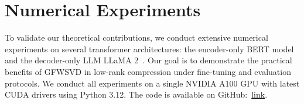 \documentclass{article}
\begin{document}





\section{Numerical Experiments}
\label{sec:experiments}

To validate our theoretical contributions, we conduct extensive numerical experiments on several transformer architectures: the encoder-only BERT model~\cite{bert} and the decoder-only LLM LLaMA 2~\cite{llama2}. Our goal is to demonstrate the practical benefits of GFWSVD in low-rank compression under fine-tuning and evaluation protocols. We conduct all experiments on a single NVIDIA A100 GPU with latest CUDA drivers using Python 3.12. The code is available on GitHub:~\href{https://github.com/sayankotor/FisherKronecker/tree/release}{link}.



\end{document}

